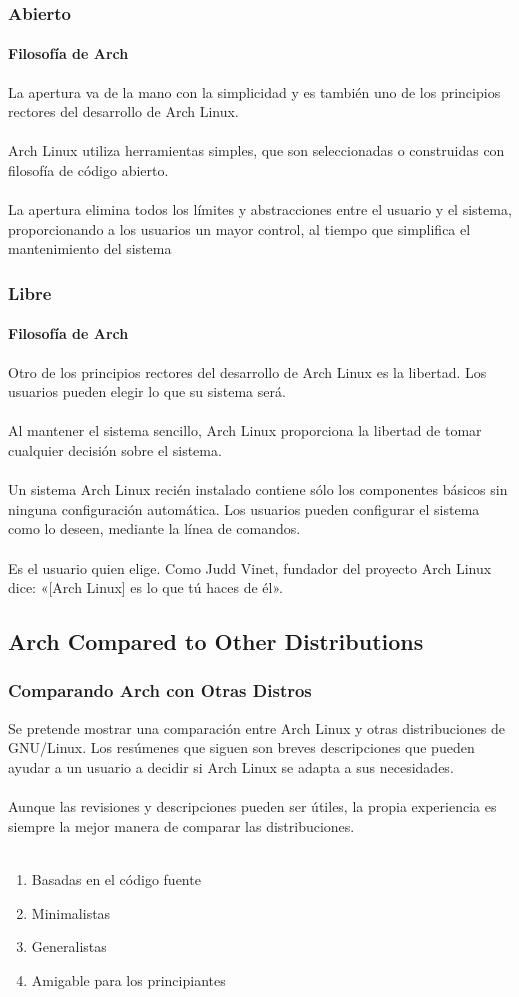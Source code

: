 \documentclass[9pt,t]{beamer}
\begin{document}
\begin{frame}\justifying
  \frametitle{Abierto}
  \framesubtitle{Filosofía de Arch}
    La apertura va de la mano con la simplicidad y es también uno de los principios rectores del desarrollo de Arch Linux.
    \ \\ \ \\
	Arch Linux utiliza herramientas simples, que son seleccionadas o construidas con filosofía de código abierto.
    \ \\ \ \\
	La apertura elimina todos los límites y abstracciones entre el usuario y el sistema, proporcionando a los usuarios un 
    mayor control, al tiempo que simplifica el mantenimiento del sistema
\end{frame}

\begin{frame}\justifying
  \frametitle{Libre}
  \framesubtitle{Filosofía de Arch}
    Otro de los principios rectores del desarrollo de Arch Linux es la libertad. Los usuarios pueden elegir lo que su 
    sistema será.
	\ \\ \ \\
    Al mantener el sistema sencillo, Arch Linux proporciona la libertad de tomar cualquier decisión sobre el sistema.
	\ \\ \ \\
    Un sistema Arch Linux recién instalado contiene sólo los componentes básicos sin ninguna configuración automática. Los 
    usuarios pueden configurar el sistema como lo deseen, mediante la línea de comandos.
	\ \\ \ \\
	Es el usuario quien elige. Como Judd Vinet, fundador del proyecto Arch Linux dice: «[Arch Linux] es lo que tú haces de él».
\end{frame}


\subsection{Arch Compared to Other Distributions}
\begin{frame}\justifying
  \frametitle{Comparando Arch con Otras Distros}
    Se pretende mostrar una comparación entre Arch Linux y otras distribuciones de GNU/Linux. 
    Los resúmenes que siguen son breves descripciones que pueden ayudar a un usuario a 
    decidir si Arch Linux se adapta a sus necesidades. 
    \ \\ \ \\
    Aunque las revisiones y descripciones pueden ser útiles, la propia experiencia es siempre 
    la mejor manera de comparar las distribuciones.
	\ \\ \ \\
    \begin{enumerate}\justifying
      \item Basadas en el código fuente
      \item Minimalistas
      \item Generalistas
      \item Amigable para los principiantes
   \end{enumerate}
\end{frame}
\end{document}
